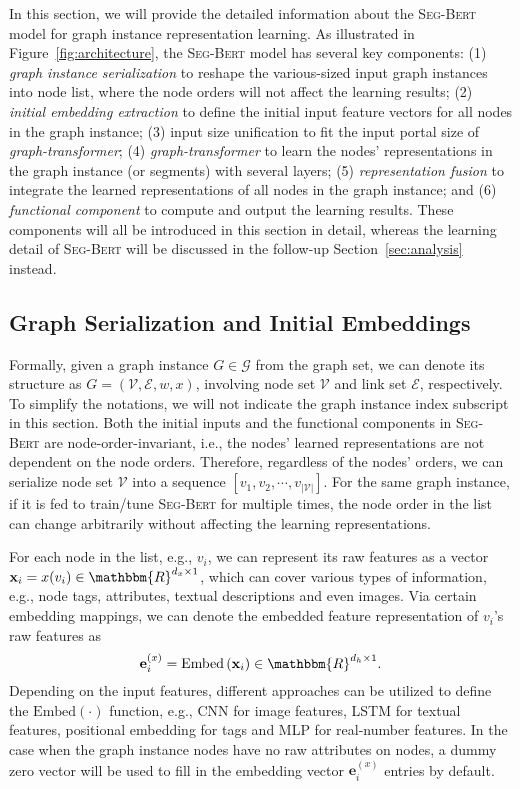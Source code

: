 \documentclass{article}
\newcommand{\mb}{\mathbf}
\newcommand{\mc}{\mathcal}
\newcommand{\our}{\textsc{Seg-Bert}}
\begin{document}
In this section, we will provide the detailed information about the {\our} model for graph instance representation learning. As illustrated in Figure~\ref{fig:architecture}, the {\our} model has several key components: (1) \textit{graph instance serialization} to reshape the various-sized input graph instances into node list, where the node orders will not affect the learning results; (2) \textit{initial embedding extraction} to define the initial input feature vectors for all nodes in the graph instance; (3) input size unification to fit the input portal size of \textit{graph-transformer}; (4) \textit{graph-transformer} to learn the nodes' representations in the graph instance (or segments) with several layers; (5) \textit{representation fusion} to integrate the learned representations of all nodes in the graph instance; and (6) \textit{functional component} to compute and output the learning results. These components will all be introduced in this section in detail, whereas the learning detail of {\our} will be discussed in the follow-up Section~\ref{sec:analysis} instead.




\subsection{Graph Serialization and Initial Embeddings}

Formally, given a graph instance $G \in \mc{G}$ from the graph set, we can denote its structure as $G = (\mc{V}, \mc{E}, w, x)$, involving node set $\mc{V}$ and link set $\mc{E}$, respectively. To simplify the notations, we will not indicate the graph instance index subscript in this section. Both the initial inputs and the functional components in {\our} are node-order-invariant, i.e., the nodes' learned representations are not dependent on the node orders. Therefore, regardless of the nodes' orders, we can serialize node set $\mc{V}$ into a sequence $[v_1, v_2, \cdots, v_{|\mc{V}|}]$. For the same graph instance, if it is fed to train/tune {\our} for multiple times, the node order in the list can change arbitrarily without affecting the learning representations.

For each node in the list, e.g., $v_i$, we can represent its raw features as a vector $\mb{x}_i = x(v_i) \in \mathbbm{R}^{d_x \times 1}$, which can cover various types of information, e.g., node tags, attributes, textual descriptions and even images. Via certain embedding mappings, we can denote the embedded feature representation of $v_i$'s raw features as
\begin{equation}
\mb{e}_i^{(x)} = \mbox{Embed} \left( \mb{x}_i \right) \in \mathbbm{R}^{d_h \times 1}.
\end{equation}
Depending on the input features, different approaches can be utilized to define the $\mbox{Embed}(\cdot)$ function, e.g., CNN for image features, LSTM for textual features, positional embedding for tags and MLP for real-number features. In the case when the graph instance nodes have no raw attributes on nodes, a dummy zero vector will be used to fill in the embedding vector $\mb{e}_i^{(x)}$ entries by default.
\end{document}
